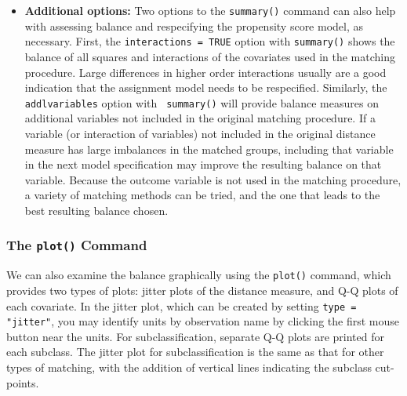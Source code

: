 \begin{itemize}
\item {\bf Additional options:} Two options to the \texttt{summary()}
  command can also help with assessing balance and respecifying the
  propensity score model, as necessary.  First, the {\tt interactions
    = TRUE} option with {\tt summary()} shows the balance of all
  squares and interactions of the covariates used in the matching
  procedure.  Large differences in higher order interactions usually
  are a good indication that the assignment model needs to be
  respecified.  Similarly, the {\tt addlvariables} option with {\tt
    summary()} will provide balance measures on additional variables
  not included in the original matching procedure.  If a variable (or
  interaction of variables) not included in the original distance
  measure has large imbalances in the matched groups, including that
  variable in the next model specification may improve the resulting
  balance on that variable.  Because the outcome variable is not used
  in the matching procedure, a variety of matching methods can be
  tried, and the one that leads to the best resulting balance chosen.
\end{itemize}

\subsubsection{The \texttt{plot()} Command}

We can also examine the balance graphically using the \texttt{plot()}
command, which provides two types of plots: jitter plots of the
distance measure, and Q-Q plots of each covariate.  In the jitter
plot, which can be created by setting \texttt{type = "jitter"}, you
may identify units by observation name by clicking the first mouse
button near the units. For subclassification, separate Q-Q plots are
printed for each subclass.  The jitter plot for subclassification is
the same as that for other types of matching, with the addition of
vertical lines indicating the subclass cut-points.



